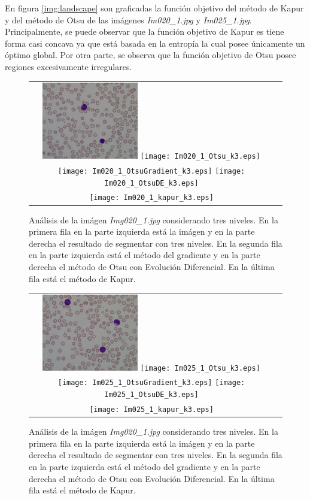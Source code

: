 \documentclass[preprint,12pt]{elsarticle}
\begin{document}
En figura \ref{img:landscape} son graficadas la función objetivo del método de Kapur y del método de Otsu de las imágenes \textit{Im020\_1.jpg} y \textit{Im025\_1.jpg}.
%
Principalmente, se puede observar que la función objetivo de Kapur es tiene forma casi concava ya que está basada en la entropía la cual posee únicamente un óptimo global.
%
Por otra parte, se observa que la función objetivo de Otsu posee regiones excesivamente irregulares.

\begin{figure}[H]
\centering
\begin{tabular}{cc}
   \includegraphics[width=0.4\textwidth]{Im020_1.jpg}
      \texttt{[image: Im020\_1\_Otsu\_k3.eps]} \\
   \texttt{[image: Im020\_1\_OtsuGradient\_k3.eps]}
      \texttt{[image: Im020\_1\_OtsuDE\_k3.eps]} \\
   \texttt{[image: Im020\_1\_kapur\_k3.eps]}
\end{tabular}
\caption{Análisis de la imágen \textit{Img020\_1.jpg} considerando tres niveles. En la primera fila en la parte izquierda está la imágen y en la parte derecha el resultado de segmentar con tres niveles. En la segunda fila en la parte izquierda está el método del gradiente y en la parte derecha el método de Otsu con Evolución Diferencial. En la última fila está el método de Kapur.}\label{img:20-3}
\end{figure}


\begin{figure}[H]
\centering
\begin{tabular}{cc}
   \includegraphics[width=0.4\textwidth]{Im025_1.jpg}
      \texttt{[image: Im025\_1\_Otsu\_k3.eps]} \\
   \texttt{[image: Im025\_1\_OtsuGradient\_k3.eps]}
      \texttt{[image: Im025\_1\_OtsuDE\_k3.eps]} \\
   \texttt{[image: Im025\_1\_kapur\_k3.eps]}
\end{tabular}
\caption{Análisis de la imágen \textit{Img020\_1.jpg} considerando tres niveles. En la primera fila en la parte izquierda está la imágen y en la parte derecha el resultado de segmentar con tres niveles. En la segunda fila en la parte izquierda está el método del gradiente y en la parte derecha el método de Otsu con Evolución Diferencial. En la última fila está el método de Kapur.}\label{img:25-3}
\end{figure}
\end{document}
